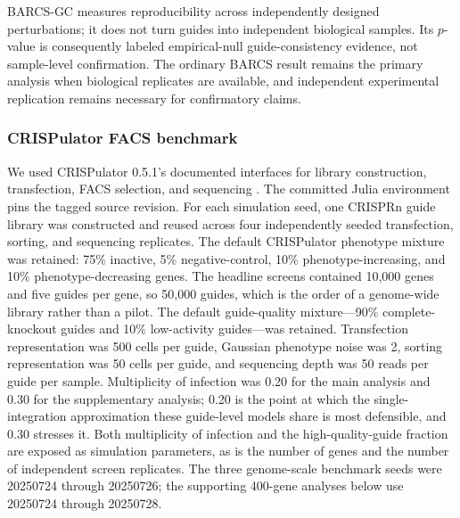 BARCS-GC measures reproducibility across independently designed
perturbations; it does not turn guides into independent biological samples.
Its $p$-value is consequently labeled empirical-null guide-consistency
evidence, not sample-level confirmation.  The ordinary BARCS result remains
the primary analysis when biological replicates are available, and
independent experimental replication remains necessary for confirmatory
claims.

\subsubsection{CRISPulator FACS benchmark}

We used CRISPulator 0.5.1's documented interfaces for library construction,
transfection, FACS selection, and sequencing \citep{nagy2017crispulator}.
The committed Julia environment pins the tagged source revision.  For each
simulation seed, one CRISPRn guide library was constructed and reused across
four independently seeded transfection, sorting, and sequencing replicates.
The default CRISPulator phenotype mixture was retained: 75\% inactive, 5\%
negative-control, 10\% phenotype-increasing, and 10\%
phenotype-decreasing genes.  The headline screens contained 10,000 genes and
five guides per gene, so 50,000 guides, which is the order of a genome-wide
library rather than a pilot.  The default guide-quality mixture---90\%
complete-knockout guides and 10\% low-activity guides---was retained.
Transfection representation was 500 cells per guide, Gaussian phenotype noise
was 2, sorting representation was 50 cells per guide, and sequencing depth was
50 reads per guide per sample.  Multiplicity of infection was 0.20 for the
main analysis and 0.30 for the supplementary analysis; 0.20 is the point at
which the single-integration approximation these guide-level models share is
most defensible, and 0.30 stresses it.  Both multiplicity of infection and the
high-quality-guide fraction are exposed as simulation parameters, as is the
number of genes and the number of independent screen replicates.
The three genome-scale benchmark seeds were 20250724 through 20250726; the
supporting 400-gene analyses below use 20250724 through 20250728.

